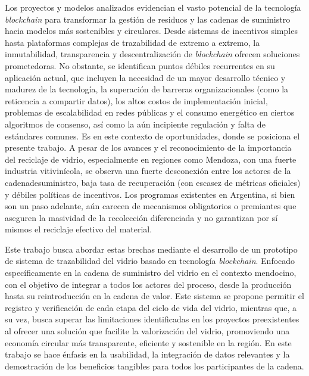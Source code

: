 Los proyectos y modelos analizados evidencian el vasto potencial de la tecnología \textit{blockchain} para transformar la gestión de residuos y las cadenas de suministro hacia modelos más sostenibles y circulares. Desde sistemas de incentivos simples hasta plataformas complejas de trazabilidad de extremo a extremo, la inmutabilidad, transparencia y descentralización de \textit{blockchain} ofrecen soluciones prometedoras. No obstante, se identifican puntos débiles recurrentes en su aplicación actual, que incluyen la necesidad de un mayor desarrollo técnico y madurez de la tecnología, la superación de barreras organizacionales (como la reticencia a compartir datos), los altos costos de implementación inicial, problemas de escalabilidad en redes públicas y el consumo energético en ciertos algoritmos de consenso, así como la aún incipiente regulación y falta de estándares comunes. Es en este contexto de oportunidades, donde se posiciona el presente trabajo. A pesar de los avances y el reconocimiento de la importancia del reciclaje de vidrio, especialmente en regiones como Mendoza, con una fuerte industria vitivinícola, se observa una fuerte desconexión entre los actores de la \gls{cadenadesuministro}, baja tasa de recuperación (con escasez de métricas oficiales) y débiles políticas de incentivos. Los programas existentes en Argentina, si bien son un paso adelante, aún carecen de mecanismos obligatorios o premiantes que aseguren la masividad de la recolección diferenciada y no garantizan por sí mismos el reciclaje efectivo del material.

Este trabajo busca abordar estas brechas mediante el desarrollo de un prototipo de sistema de trazabilidad del vidrio basado en tecnología \textit{blockchain}. Enfocado específicamente en la cadena de suministro del vidrio en el contexto mendocino, con el objetivo de integrar a todos los actores del proceso, desde la producción hasta su reintroducción en la cadena de valor. Este sistema se propone permitir el registro y verificación de cada etapa del ciclo de vida del vidrio, mientras que, a su vez, busca superar las limitaciones identificadas en los proyectos preexistentes al ofrecer una solución que facilite la valorización del vidrio, promoviendo una economía circular más transparente, eficiente y sostenible en la región. En este trabajo se hace énfasis en la usabilidad, la integración de datos relevantes y la demostración de los beneficios tangibles para todos los participantes de la cadena.
